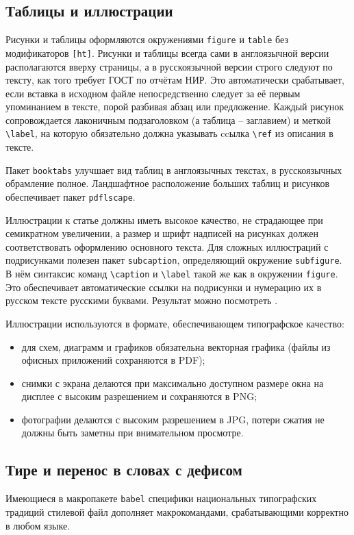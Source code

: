 \documentclass{psta}%
\begin{document}
\subsection{Таблицы и иллюстрации}
Рисунки и таблицы оформляются окружениями \verb|figure| и \verb|table| без модификаторов \verb|[ht]|.
Рисунки и таблицы всегда сами в англоязычной версии располагаются вверху страницы, а в русскоязычной версии строго следуют по тексту, как того требует ГОСТ по отчётам НИР.
Это автоматически срабатывает, если вставка в исходном файле непосредственно следует за её первым упоминанием в тексте, порой разбивая абзац или предложение.
Каждый рисунок сопровождается лаконичным подзаголовком (а таблица \--- заглавием) и меткой \verb|\label|, на которую обязательно должна указывать ccылка \verb|\ref| из описания в тексте.

Пакет \verb|booktabs| улучшает вид таблиц в англоязычных текстах, в русскоязычных обрамление полное.
Ландшафтное расположение больших таблиц и рисунков  обеспечивает пакет \verb|pdflscape|.

Иллюстрации к статье должны иметь высокое качество, не страдающее при семикратном увеличении, а размер и шрифт надписей на рисунках должен соответствовать оформлению основного текста.
Для сложных иллюстраций с подрисунками полезен пакет \verb|subcaption|, определяющий окружение \verb|subfigure|. В нём синтаксис команд \verb|\caption| и \verb|\label| такой же как в окружении \verb|figure|. Это обеспечивает автоматические ссылки на подрисунки и нумерацию их в русском тексте русскими буквами.
Результат можно посмотреть .

Иллюстрации используются в формате, обеспечивающем типографское качество:
\begin{itemize}
\item для схем, диаграмм и графиков обязательна  векторная графика (файлы из офисных приложений сохраняются в PDF);
\item снимки с экрана делаются при максимально доступном размере окна на дисплее с высоким разрешением и сохраняются в PNG;
\item фотографии делаются с высоким разрешением в JPG, потери сжатия не должны быть заметны при внимательном просмотре.
\end{itemize}


\subsection{Тире и перенос в словах с дефисом}\label{sec:auto}
Имеющиеся в макропакете \texttt{babel} специфики национальных типографских традиций стилевой файл дополняет макрокомандами, срабатывающими корректно в любом языке.
\end{document}

